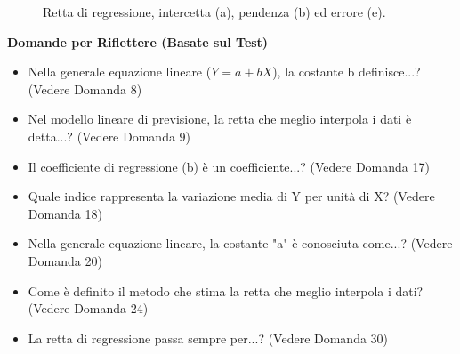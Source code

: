 \documentclass[12pt, a4paper]{article}
\newenvironment{reflectionbox}{%
    \medskip
    \begin{framed}\par\noindent
    \textbf{\color{boxtitlecolor}Domande per Riflettere (Basate sul Test)} \par
    \begin{itemize}[leftmargin=*, label=$\blacktriangleright$]
}{%
    \end{itemize}\par
    \end{framed}
    \medskip
}
\newcommand{\Yhat}{\hat{Y}} %
\begin{document}
\begin{figure}[h!]
\caption{Retta di regressione, intercetta (a), pendenza (b) ed errore (e).}
\label{fig:regression_line}
\end{figure}

\begin{reflectionbox}
    \item Nella generale equazione lineare ($Y = a + bX$), la costante b definisce...? (Vedere Domanda 8)
    \item Nel modello lineare di previsione, la retta che meglio interpola i dati è detta...? (Vedere Domanda 9)
    \item Il coefficiente di regressione (b) è un coefficiente...? (Vedere Domanda 17)
    \item Quale indice rappresenta la variazione media di Y per unità di X? (Vedere Domanda 18)
    \item Nella generale equazione lineare, la costante "a" è conosciuta come...? (Vedere Domanda 20)
    \item Come è definito il metodo che stima la retta che meglio interpola i dati? (Vedere Domanda 24)
    \item La retta di regressione passa sempre per...? (Vedere Domanda 30)
\end{reflectionbox}
\end{document}
